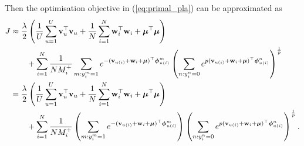 Then the optimisation objective in (\ref{eq:primal_pla}) can be approximated as
\begin{equation*}
\begin{aligned}
J 
&\approx \frac{\lambda}{2} \left( \frac{1}{U} \sum_{u=1}^U \mathbf{v}_u^\top \mathbf{v}_u + \frac{1}{N} \sum_{i=1}^N \mathbf{w}_i^\top \mathbf{w}_i + \bm{\mu}^\top \bm{\mu} \right) \\
& \hspace{2em}
  + \sum_{i=1}^N \frac{1}{N M_i^+} \sum_{m: y_i^m = 1} 
    e^{-(\mathbf{v}_{u(i)} + \mathbf{w}_i + \bm{\mu})^\top \bm{\phi}_{u(i)}^m}
    \left( \sum_{n: y_i^n = 0} e^{p (\mathbf{v}_{u(i)} + \mathbf{w}_i + \bm{\mu})^\top \bm{\phi}_{u(i)}^n} \right)^\frac{1}{p} \\
&= \frac{\lambda}{2} \left( \frac{1}{U} \sum_{u=1}^U \mathbf{v}_u^\top \mathbf{v}_u + \frac{1}{N} \sum_{i=1}^N \mathbf{w}_i^\top \mathbf{w}_i + \bm{\mu}^\top \bm{\mu} \right) \\
& \hspace{2em}
  + \sum_{i=1}^N \frac{1}{N M_i^+} 
    \left( \sum_{m: y_i^m = 1} e^{-(\mathbf{v}_{u(i)} + \mathbf{w}_i + \bm{\mu})^\top \bm{\phi}_{u(i)}^m} \right)
    \left( \sum_{n: y_i^n = 0} e^{p (\mathbf{v}_{u(i)} + \mathbf{w}_i + \bm{\mu})^\top \bm{\phi}_{u(i)}^n} \right)^\frac{1}{p}.
\end{aligned}
\end{equation*}

